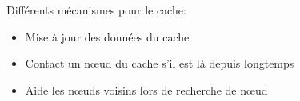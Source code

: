 \documentclass{beamer}
\begin{document}
  \begin{frame}	
  \end{frame}

  \begin{frame}


  \end{frame}

  \begin{frame}
	Différents mécanismes pour le cache:
	\begin{itemize}
		\item Mise à jour des données du cache
		\item Contact un nœud du cache s'il est là depuis longtemps
		\item Aide les nœuds voisins lors de recherche de nœud	
	\end{itemize}
	
  \end{frame}

 
\end{document}

